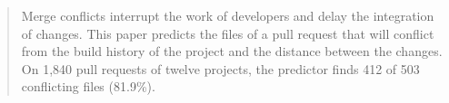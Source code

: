 \begin{abstract}
Merge conflicts interrupt the work of developers and delay the integration of changes. This paper predicts the
files of a pull request that will conflict from the build history of the project and the distance between the
changes. On 1,840 pull requests of twelve projects, the predictor finds 412 of 503 conflicting files (81.9\%).
\end{abstract}
